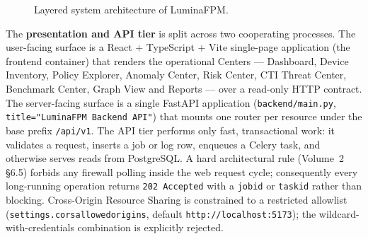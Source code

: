 \documentclass[12pt,a4paper]{report}
\renewcommand{\_}{\textunderscore\allowbreak}
\begin{document}
\begin{figure}[htbp]
\centering
{}
\caption{Layered system architecture of LuminaFPM.}
\label{fig:arch}
\end{figure}

The \textbf{presentation and API tier} is split across two cooperating processes. The user-facing surface is a React + TypeScript + Vite single-page application (the frontend container) that renders the operational Centers --- Dashboard, Device Inventory, Policy Explorer, Anomaly Center, Risk Center, CTI Threat Center, Benchmark Center, Graph View and Reports --- over a read-only HTTP contract. The server-facing surface is a single FastAPI application (\texttt{backend/main.py}, \texttt{title="LuminaFPM Backend API"}) that mounts one router per resource under the base prefix \texttt{/api/v1}. The API tier performs only fast, transactional work: it validates a request, inserts a job or log row, enqueues a Celery task, and otherwise serves reads from PostgreSQL. A hard architectural rule (Volume~2 \S6.5) forbids any firewall polling inside the web request cycle; consequently every long-running operation returns \texttt{202 Accepted} with a \texttt{job\_id} or \texttt{task\_id} rather than blocking. Cross-Origin Resource Sharing is constrained to a restricted allowlist (\texttt{settings.cors\_allowed\_origins}, default \texttt{http://localhost:5173}); the wildcard-with-credentials combination is explicitly rejected.
\end{document}
